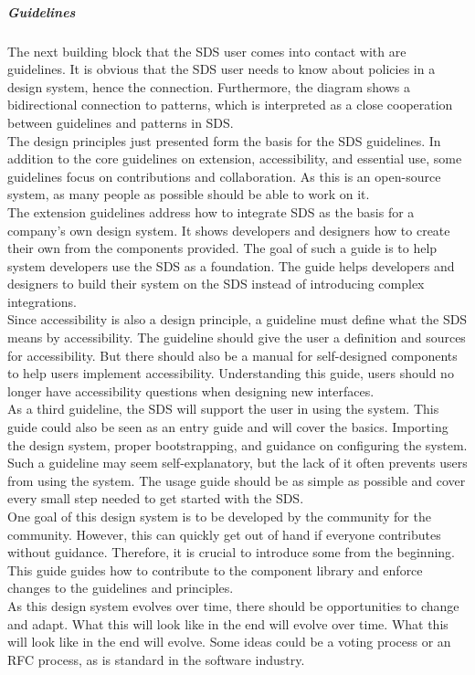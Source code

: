 \subparagraph{Guidelines}
The next building block that the SDS user comes into contact with are guidelines. It is obvious that the SDS user needs to know about policies in a design system, hence the connection. Furthermore, the diagram shows a bidirectional connection to patterns, which is interpreted as a close cooperation between guidelines and patterns in SDS.\\
The design principles just presented form the basis for the \ac{SDS} guidelines. In addition to the core guidelines on extension, accessibility, and essential use, some guidelines focus on contributions and collaboration. As this is an open-source system, as many people as possible should be able to work on it. \\
The extension guidelines address how to integrate \ac{SDS} as the basis for a company's own design system. It shows developers and designers how to create their own from the components provided. The goal of such a guide is to help system developers use the SDS as a foundation. The guide helps developers and designers to build their system on the SDS instead of introducing complex integrations. \\
Since accessibility is also a design principle, a guideline must define what the \ac{SDS} means by accessibility. The guideline should give the user a definition and sources for accessibility. But there should also be a manual for self-designed components to help users implement accessibility. Understanding this guide, users should no longer have accessibility questions when designing new interfaces. \\
As a third guideline, the \ac{SDS} will support the user in using the system. This guide could also be seen as an entry guide and will cover the basics. Importing the design system, proper bootstrapping, and guidance on configuring the system. Such a guideline may seem self-explanatory, but the lack of it often prevents users from using the system. The usage guide should be as simple as possible and cover every small step needed to get started with the \ac{SDS}. \\
One goal of this design system is to be developed by the community for the community. However, this can quickly get out of hand if everyone contributes without guidance. Therefore, it is crucial to introduce some from the beginning. This guide guides how to contribute to the component library and enforce changes to the guidelines and principles. \\
As this design system evolves over time, there should be opportunities to change and adapt. What this will look like in the end will evolve over time. What this will look like in the end will evolve. Some ideas could be a voting process or an RFC process, as is standard in the software industry. \\
